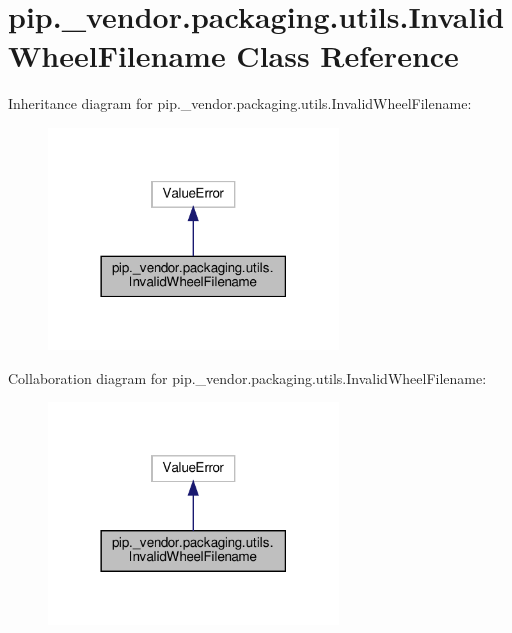 \hypertarget{classpip_1_1__vendor_1_1packaging_1_1utils_1_1InvalidWheelFilename}{}\section{pip.\+\_\+vendor.\+packaging.\+utils.\+Invalid\+Wheel\+Filename Class Reference}
\label{classpip_1_1__vendor_1_1packaging_1_1utils_1_1InvalidWheelFilename}


Inheritance diagram for pip.\+\_\+vendor.\+packaging.\+utils.\+Invalid\+Wheel\+Filename\+:
\nopagebreak
\begin{figure}[H]
\begin{center}
\leavevmode
\includegraphics[width=218pt]{classpip_1_1__vendor_1_1packaging_1_1utils_1_1InvalidWheelFilename__inherit__graph}
\end{center}
\end{figure}


Collaboration diagram for pip.\+\_\+vendor.\+packaging.\+utils.\+Invalid\+Wheel\+Filename\+:
\nopagebreak
\begin{figure}[H]
\begin{center}
\leavevmode
\includegraphics[width=218pt]{classpip_1_1__vendor_1_1packaging_1_1utils_1_1InvalidWheelFilename__coll__graph}
\end{center}
\end{figure}


